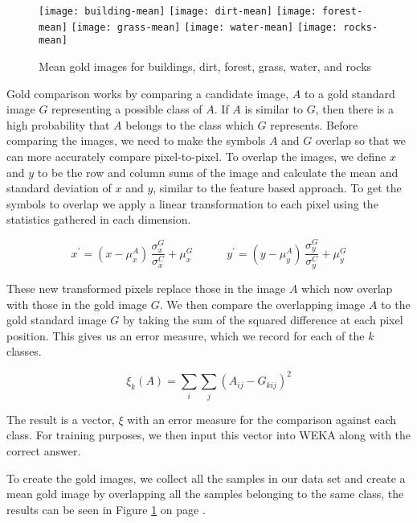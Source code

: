 
\begin{figure}[h]
\texttt{[image: building-mean]}
\texttt{[image: dirt-mean]}
\texttt{[image: forest-mean]}
\texttt{[image: grass-mean]}
\texttt{[image: water-mean]}
\texttt{[image: rocks-mean]}
\caption{Mean gold images for buildings, dirt, forest, grass, water, and rocks}
\label{figure:means}
\end{figure}


Gold comparison works by comparing a candidate image, $A$ to a gold standard
image $G$ representing a possible class of $A$. If $A$ is similar to $G$, then
there is a high probability that $A$ belongs to the class which $G$ represents.
Before comparing the images, we need to make the symbols $A$ and $G$ overlap so
that we can more accurately compare pixel-to-pixel.  To overlap the images, we
define $x$ and $y$ to be the row and column sums of the image and calculate the
mean and standard deviation of $x$ and $y$, similar to the feature based
approach. To get the symbols to overlap we apply a linear transformation to
each pixel using the statistics gathered in each dimension.

\[
\label{eq:gold}
x^{\prime} = (x - \mu^{A}_{x}) \, \frac{\sigma^{G}_{x}}{\sigma^{C}_{x}} + \mu^{G}_{x}
\quad\quad\quad
y^{\prime} = (y - \mu^{A}_{y}) \, \frac{\sigma^{G}_{y}}{\sigma^{C}_{y}} + \mu^{G}_{y}
\]

These new transformed pixels replace those in the image $A$ which now overlap
with those in the gold image $G$. We then compare the overlapping image $A$ to
the gold standard image $G$ by taking the sum of the squared difference at each
pixel position. This gives us an error measure, which we record for each of the
$k$ classes.

\[ \xi_{k}(A) = \sum_{i}\sum_{j}{(A_{ij} - G_{kij})^{2}} \]

The result is a vector, $\xi$ with an error measure for the comparison against
each class. For training purposes, we then input this vector into WEKA along
with the correct answer.

To create the gold images, we collect all the samples in our data set and
create a mean gold image by overlapping all the samples belonging to the same
class, the results can be seen in Figure \ref{figure:means} on page
\pageref{figure:means}.
